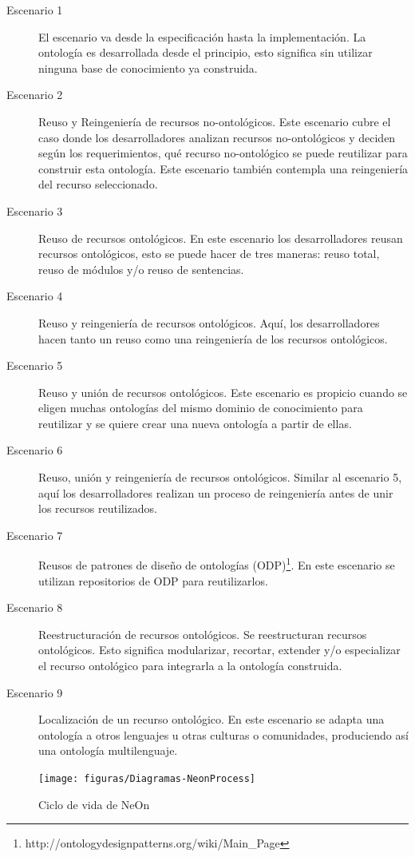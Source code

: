 \begin{description}
    \item[Escenario 1] El escenario va desde la especificación hasta la implementación. La ontología es desarrollada desde el principio, esto significa sin utilizar ninguna base de conocimiento ya construida.
    \item[Escenario 2] Reuso y Reingeniería de recursos no-ontológicos. Este escenario cubre el caso donde los desarrolladores analizan recursos no-ontológicos y deciden según los requerimientos, qué recurso no-ontológico se puede reutilizar para construir esta ontología. Este escenario también contempla una reingeniería del recurso seleccionado.
    \item[Escenario 3] Reuso de recursos ontológicos. En este escenario los desarrolladores reusan recursos ontológicos, esto se puede hacer de tres maneras: reuso total, reuso de módulos y/o reuso de sentencias.
    \item[Escenario 4] Reuso y reingeniería de recursos ontológicos. Aquí, los desarrolladores hacen tanto un reuso como una reingeniería de los recursos ontológicos.
    \item[Escenario 5] Reuso y unión de recursos ontológicos. Este escenario es propicio cuando se eligen muchas ontologías del mismo dominio de conocimiento para reutilizar y se quiere crear una nueva ontología a partir de ellas.
    \item[Escenario 6] Reuso, unión y reingeniería de recursos ontológicos. Similar al escenario 5, aquí los desarrolladores realizan un proceso de reingeniería antes de unir los recursos reutilizados.
    \item[Escenario 7] Reusos de patrones de diseño de ontologías (ODP)\footnote{http://ontologydesignpatterns.org/wiki/Main\_Page}. En este escenario se utilizan repositorios de ODP para reutilizarlos.
    \item[Escenario 8] Reestructuración de recursos ontológicos. Se reestructuran recursos ontológicos. Esto significa modularizar, recortar, extender y/o especializar el recurso ontológico para integrarla a la ontología construida.
    \item[Escenario 9] Localización de un recurso ontológico. En este escenario se adapta una ontología a otros lenguajes u otras culturas o comunidades, produciendo así una ontología multilenguaje.
\end{description}

\begin{figure}[h!]
    \centering
    \texttt{[image: figuras/Diagramas-NeonProcess]}
    \caption{Ciclo de vida de NeOn \cite{Suarez-Figueroa:2012:OEN:2341178}}
    \label{img:neon ciclo de vida}
    \end{figure}

